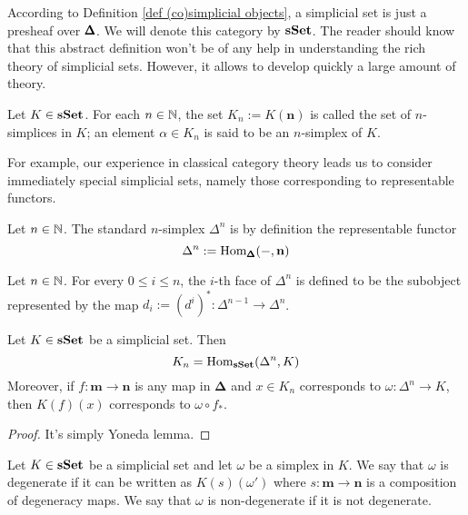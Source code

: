 \begin{refsection}
According to Definition \ref{def (co)simplicial objects}, a simplicial set is just a presheaf over $\pmb{\Delta}$. We will denote this category by $\mathbf{sSet}$. The reader should know that this abstract definition won't be of any help in understanding the rich theory of simplicial sets. However, it allows to develop quickly a large amount of theory.

\begin{defin}
Let $K \in \mathbf{sSet}$. For each $n \in \mathbb{N}$, the set $K_n := K(\mathbf n)$ is called the set of $n$-simplices in $K$; an element $\alpha \in K_n$ is said to be an $n$-simplex of $K$.
\end{defin}

For example, our experience in classical category theory leads us to consider immediately special simplicial sets, namely those corresponding to representable functors.

\begin{defin}
Let $n \in \mathbb{N}$. The standard $n$-simplex $\Delta^n$ is by definition the representable functor
\[
\Delta^n := \mathrm{Hom}_{\pmb{\Delta}}(-,\mathbf n)
\]
\end{defin}

\begin{defin} \label{def face}
Let $n \in \mathbb{N}$. For every $0 \le i \le n$, the $i$-th face of $\Delta^n$ is defined to be the subobject represented by the map $d_i := (d^i)^* \colon \Delta^{n-1} \to \Delta^n$.
\end{defin}

\begin{prop} \label{prop simplicial morphisms with Yoneda identification}
Let $K \in \mathbf{sSet}$ be a simplicial set. Then
\[
K_n = \mathrm{Hom}_{\mathbf{sSet}}(\Delta^n,K)
\]
Moreover, if $f \colon \mathbf m \to \mathbf n$ is any map in $\mathbf \Delta$ and $x \in K_n$ corresponds to $\omega \colon \Delta^n \to K$, then $K(f)(x)$ corresponds to $\omega \circ f_*$.
\end{prop}

\begin{proof}
It's simply Yoneda lemma.
\end{proof}

\begin{defin}
Let $K \in \mathbf{sSet}$ be a simplicial set and let $\omega$ be a simplex in $K$. We say that $\omega$ is degenerate if it can be written as $K(s)(\omega')$ where $s \colon \mathbf m \to \mathbf n$ is a composition of degeneracy maps. We say that $\omega$ is non-degenerate if it is not degenerate.
\end{defin}


\end{refsection}
